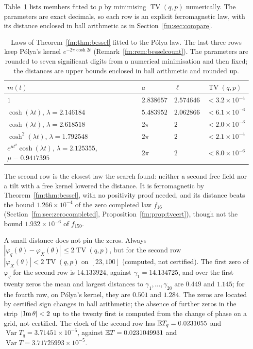 Table~\ref{fm:tab:bessel} lists members fitted to $p$ by minimising $\operatorname{TV}(q,p)$ numerically. The parameters are exact decimals, so each row is an explicit ferromagnetic law, with its distance enclosed in ball arithmetic as in Section~\ref{fm:sec:compare}.

\begin{table}[htbp]
\centering\small
\begin{tabular}{@{}llll@{}}
\toprule
$m(t)$ & $a$ & $\ell$ & $\operatorname{TV}(q,p)$\\
\midrule
$1$ & $2.838657$ & $2.574646$ & $<3.2\times10^{-4}$\\
$\cosh(\lambda t)$, $\lambda=2.146184$ & $5.483952$ & $2.062866$ & $<6.1\times10^{-6}$\\
$\cosh(\lambda t)$, $\lambda=2.618518$ & $2\pi$ & $2$ & $<2.0\times10^{-3}$\\
$\cosh^2(\lambda t)$, $\lambda=1.792548$ & $2\pi$ & $2$ & $<2.1\times10^{-4}$\\
$e^{\mu t^2}\cosh(\lambda t)$, $\lambda=2.125355$, $\mu=0.9417395$ & $2\pi$ & $2$ & $<8.0\times10^{-6}$\\
\bottomrule
\end{tabular}
\caption{Laws of Theorem~\ref{fm:thm:bessel} fitted to the P\'olya law. The last three rows keep P\'olya's kernel $e^{-2\pi\cosh2t}$ (Remark~\ref{fm:rem:besselcount}). The parameters are rounded to seven significant digits from a numerical minimisation and then fixed; the distances are upper bounds enclosed in ball arithmetic and rounded up.}
\label{fm:tab:bessel}
\end{table}

The second row is the closest law the search found: neither a second free field nor a tilt with a free kernel lowered the distance. It is ferromagnetic by Theorem~\ref{fm:thm:bessel}, with no positivity proof needed, and its distance beats the bound $1.266\times10^{-4}$ of the zero completed law $f_{16}$ (Section~\ref{fm:sec:zerocompleted}, Proposition~\ref{fm:prop:tvcert}), though not the bound $1.932\times10^{-6}$ of $f_{150}$.

A small distance does not pin the zeros. Always $|\varphi_q(\theta)-\varphi_X(\theta)|\le2\operatorname{TV}(q,p)$, but for the second row $|\varphi_X(\theta)|<2\operatorname{TV}(q,p)$ on $[23,100]$ (computed, not certified). The first zero of $\varphi_q$ for the second row is $14.133924$, against $\gamma_1=14.134725$, and over the first twenty zeros the mean and largest distances to $\gamma_1,\dots,\gamma_{20}$ are $0.449$ and $1.145$; for the fourth row, on P\'olya's kernel, they are $0.501$ and $1.284$. The zeros are located by certified sign changes in ball arithmetic; the absence of further zeros in the strip $|\operatorname{Im}\theta|<2$ up to the twenty first is computed from the change of phase on a grid, not certified. The clock of the second row has $\mathbb{E} T_q=0.0231055$ and $\operatorname{Var}T_q=3.71451\times10^{-5}$, against $\mathbb{E} T=0.0231049931$ and $\operatorname{Var}T=3.71725993\times10^{-5}$.

